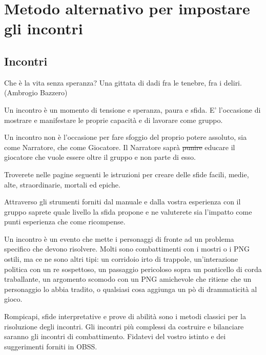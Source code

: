 \documentclass[a4paper,twoside,openany]{book}
\begin{document}
\section{Metodo alternativo per impostare gli incontri}

\subsection{Incontri}

\label{incontri}

\begin{changemargin}{0.3cm}{0.3cm}\begin{enfasi}{Che è la vita senza speranza? Una gittata di dadi fra le tenebre, fra i deliri. (Ambrogio Bazzero)}
\end{enfasi}\end{changemargin}

\medskip

Un incontro è un momento di tensione e speranza, paura e sfida. E' l'occasione di mostrare e manifestare le proprie capacità e di lavorare come gruppo.

Un incontro non è l'occasione per fare sfoggio del proprio potere assoluto, sia come Narratore, che come Giocatore. Il Narratore saprà \st{punire} educare il giocatore che vuole essere oltre il gruppo e non parte di esso.

Troverete nelle pagine seguenti le istruzioni per creare delle sfide facili, medie, alte, straordinarie, mortali ed epiche.

Attraverso gli strumenti forniti dal manuale e dalla vostra esperienza con il gruppo saprete quale livello la sfida propone e ne valuterete sia l'impatto come punti esperienza che come ricompense.

Un incontro è un evento che mette i personaggi di fronte ad un problema specifico che devono risolvere. Molti sono combattimenti con i mostri o i PNG ostili, ma ce ne sono altri tipi: un corridoio irto di trappole, un'interazione politica con un re sospettoso, un passaggio pericoloso sopra un ponticello di corda traballante, un argomento scomodo con un PNG amichevole che ritiene che un personaggio lo abbia tradito, o qualsiasi cosa aggiunga un pò di drammaticità al gioco.

Rompicapi, sfide interpretative e prove di abilità sono i metodi classici per la risoluzione degli incontri. Gli incontri più complessi da costruire e bilanciare saranno gli incontri di combattimento. Fidatevi del vostro istinto e dei suggerimenti forniti in OBSS.
\end{document}
